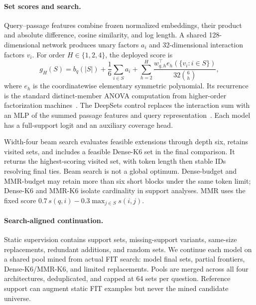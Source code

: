 \documentclass[runningheads]{llncs}
\begin{document}
\paragraph{Set scores and search.}
Query--passage features combine frozen normalized embeddings, their product
and absolute difference, cosine similarity, and log length. A shared
128-dimensional network produces unary factors $a_i$ and 32-dimensional
interaction factors $v_i$. For order $H\in\{1,2,4\}$, the deployed score is
\begin{equation}\label{eq:score}
g_H(S)=b_q(|S|)+\frac1{6}\sum_{i\in S}a_i+
\sum_{h=2}^{H}\frac{w_{q,h}^{\top}e_h(\{v_i:i\in S\})}{32\binom6h},
\end{equation}
where $e_h$ is the coordinatewise elementary symmetric polynomial.
Its recurrence is the standard distinct-member ANOVA computation from
higher-order factorization machines~\cite{blondel2016hofm}.
The DeepSets control replaces the interaction sum with an MLP of the summed
passage features and query representation~\cite{zaheer2017deepsets}.
Each model has a full-support logit and an auxiliary coverage head.

Width-four beam search evaluates feasible extensions through depth six,
retains visited sets, and includes a feasible Dense-K6 set in the final
comparison. It returns the highest-scoring visited set, with token length
then stable IDs resolving final ties. Beam search is not a global optimum.
Dense-budget and MMR-budget may retain more than six short blocks under the
same token limit; Dense-K6 and MMR-K6 isolate cardinality in support analyses.
MMR uses the fixed score $0.7\,s(q,i)-0.3\max_{j\in S}s(i,j)$.

\paragraph{Search-aligned continuation.}
Static supervision contains support sets, missing-support variants,
same-size replacements, redundant additions, and random sets. We continue
each model on a shared pool mined from actual FIT search: model final sets,
partial frontiers, Dense-K6/MMR-K6, and limited replacements. Pools are
merged across all four architectures, deduplicated, and capped at 64 sets
per question. Reference support can augment static FIT examples but never
the mined candidate universe.
\end{document}
